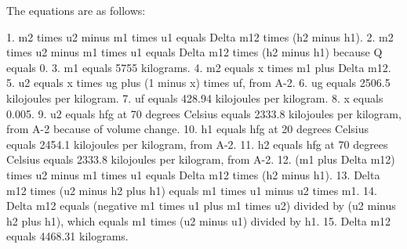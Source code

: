 The equations are as follows:

1. m2 times u2 minus m1 times u1 equals Delta m12 times (h2 minus h1).
2. m2 times u2 minus m1 times u1 equals Delta m12 times (h2 minus h1) because Q equals 0.
3. m1 equals 5755 kilograms.
4. m2 equals x times m1 plus Delta m12.
5. u2 equals x times ug plus (1 minus x) times uf, from A-2.
6. ug equals 2506.5 kilojoules per kilogram.
7. uf equals 428.94 kilojoules per kilogram.
8. x equals 0.005.
9. u2 equals hfg at 70 degrees Celsius equals 2333.8 kilojoules per kilogram, from A-2 because of volume change.
10. h1 equals hfg at 20 degrees Celsius equals 2454.1 kilojoules per kilogram, from A-2.
11. h2 equals hfg at 70 degrees Celsius equals 2333.8 kilojoules per kilogram, from A-2.
12. (m1 plus Delta m12) times u2 minus m1 times u1 equals Delta m12 times (h2 minus h1).
13. Delta m12 times (u2 minus h2 plus h1) equals m1 times u1 minus u2 times m1.
14. Delta m12 equals (negative m1 times u1 plus m1 times u2) divided by (u2 minus h2 plus h1), which equals m1 times (u2 minus u1) divided by h1.
15. Delta m12 equals 4468.31 kilograms.